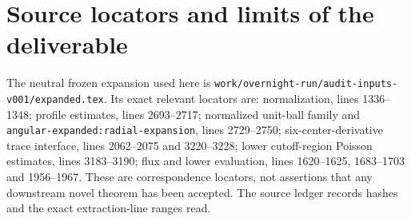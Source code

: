 \documentclass[11pt]{article}
\theoremstyle{definition}
\theoremstyle{remark}
\numberwithin{equation}{section}
\begin{document}
\section{Source locators and limits of the deliverable}\label{family-supp:sec:sources}

The neutral frozen expansion used here is
\nolinkurl{work/overnight-run/audit-inputs-v001/expanded.tex}. Its exact
relevant locators are: normalization, lines 1336--1348;
profile estimates, lines 2693--2717; normalized unit-ball family and
\nolinkurl{angular-expanded:radial-expansion}, lines 2729--2750;
six-center-derivative trace interface, lines 2062--2075 and 3220--3228;
lower cutoff-region Poisson estimates, lines 3183--3190;
flux and lower evaluation, lines 1620--1625, 1683--1703 and 1956--1967.
These are correspondence locators, not assertions that any downstream
novel theorem has been accepted. The source ledger records hashes and
the exact extraction-line ranges read.
\end{document}
